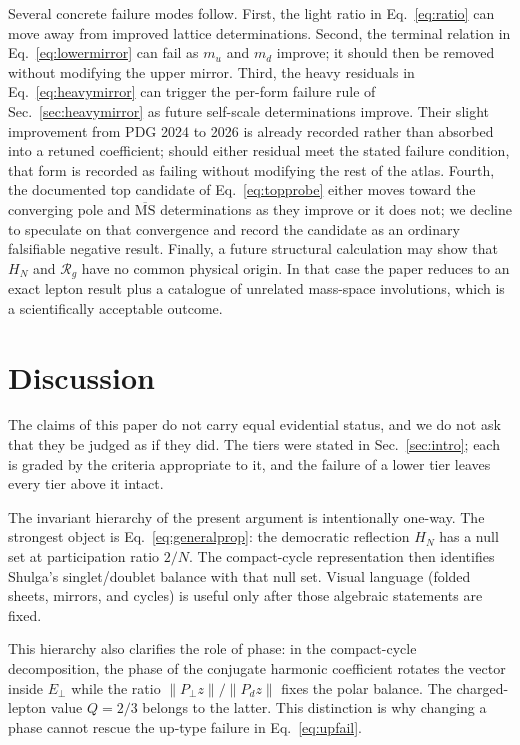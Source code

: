 \documentclass[aps,twocolumn,superscriptaddress,nofootinbib,floatfix]{revtex4-2}
\newcommand{\MSbar}{\overline{\mathrm{MS}}}
\newcommand{\RR}{\mathcal R}
\begin{document}
Several concrete failure modes follow. First, the light ratio in Eq.~\eqref{eq:ratio} can move away from improved lattice determinations. Second, the terminal relation in Eq.~\eqref{eq:lowermirror} can fail as $m_u$ and $m_d$ improve; it should then be removed without modifying the upper mirror. Third, the heavy residuals in Eq.~\eqref{eq:heavymirror} can trigger the per-form failure rule of Sec.~\ref{sec:heavymirror} as future self-scale determinations improve. Their slight improvement from PDG 2024 to 2026 is already recorded rather than absorbed into a retuned coefficient; should either residual meet the stated failure condition, that form is recorded as failing without modifying the rest of the atlas. Fourth, the documented top candidate of Eq.~\eqref{eq:topprobe} either moves toward the converging pole and $\MSbar$ determinations as they improve or it does not; we decline to speculate on that convergence and record the candidate as an ordinary falsifiable negative result. Finally, a future structural calculation may show that $H_N$ and $\RR_g$ have no common physical origin. In that case the paper reduces to an exact lepton result plus a catalogue of unrelated mass-space involutions, which is a scientifically acceptable outcome.

\section{Discussion}
\label{sec:discussion}

The claims of this paper do not carry equal evidential status, and we do not ask that they be judged as if they did. The tiers were stated in Sec.~\ref{sec:intro}; each is graded by the criteria appropriate to it, and the failure of a lower tier leaves every tier above it intact.

The invariant hierarchy of the present argument is intentionally one-way. The strongest object is Eq.~\eqref{eq:generalprop}: the democratic reflection $H_N$ has a null set at participation ratio $2/N$. The compact-cycle representation then identifies Shulga's singlet/doublet balance with that null set. Visual language (folded sheets, mirrors, and cycles) is useful only after those algebraic statements are fixed.

This hierarchy also clarifies the role of phase: in the compact-cycle decomposition, the phase of the conjugate harmonic coefficient rotates the vector inside $E_\perp$ while the ratio $\|P_\perp z\|/\|P_dz\|$ fixes the polar balance. The charged-lepton value $Q=2/3$ belongs to the latter. This distinction is why changing a phase cannot rescue the up-type failure in Eq.~\eqref{eq:upfail}.
\end{document}
